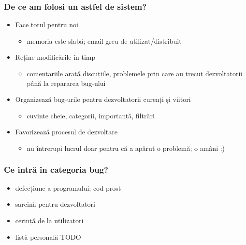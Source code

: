 \documentclass{beamer}
\begin{document}
\begin{frame}[allowframebreaks] %
\frametitle{De ce am folosi un astfel de sistem?}
\begin{itemize}
\item Face totul pentru noi
\begin{itemize}
\item memoria este slabă; email greu de utilizat/distribuit
\end{itemize}
\item Reține modificările în timp
\begin{itemize}
\item comentariile arată discuțiile, problemele prin care au trecut dezvoltatorii până la repararea bug-ului
\end{itemize}
\item Organizează bug-urile pentru dezvoltatorii curenți și viitori
\begin{itemize}
\item cuvinte cheie, categorii, importanță, filtrări
\end{itemize}
\item Favorizează procesul de dezvoltare
\begin{itemize}
\item nu întrerupi lucrul doar pentru că a apărut o problemă; o amâni :)
\end{itemize}
\end{itemize}
\end{frame}

\begin{frame}
\frametitle{Ce intră în categoria bug?}
\begin{itemize}
\pause \item defecțiune a programului; cod prost
\pause \item sarcină pentru dezvoltatori
\pause \item cerință de la utilizatori
\pause \item listă personală TODO
\end{itemize}
\end{frame}
\end{document}
